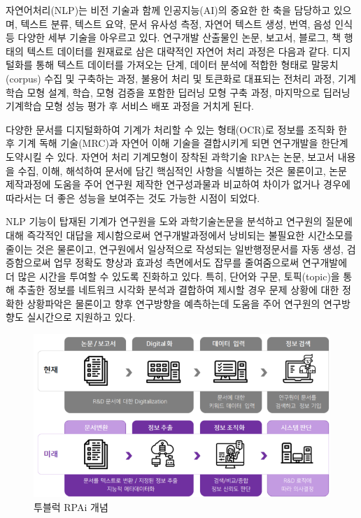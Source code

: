 \documentclass[smallextended]{svjour3}       %
\begin{document}
자연어처리(NLP)는 비전 기술과 함께 인공지능(AI)의 중요한 한 축을
담당하고 있으며, 텍스트 분류, 텍스트 요약, 문서 유사성 측정, 자연어
텍스트 생성, 번역, 음성 인식 등 다양한 세부 기술을 아우르고 있다.
연구개발 산출물인 논문, 보고서, 블로그, 책 행태의 텍스트 데이터를
원재료로 삼은 대략적인 자연어 처리 과정은 다음과 같다. 디지털화를 통해
텍스트 데이터를 가져오는 단계, 데이터 분석에 적합한 형태로
말뭉치(corpus) 수집 및 구축하는 과정, 불용어 처리 및 토큰화로 대표되는
전처리 과정, 기계학습 모형 설계, 학습, 모형 검증을 포함한 딥러닝 모형
구축 과정, 마지막으로 딥러닝 기계학습 모형 성능 평가 후 서비스 배포
과정을 거치게 된다.

다양한 문서를 디지털화하여 기계가 처리할 수 있는 형태(OCR)로 정보를
조직화 한 후 기계 독해 기술(MRC)과 자연어 이해 기술을 결합시키게 되면
연구개발을 한단계 도약시킬 수 있다. 자연어 처리 기계모형이 장착된
과학기술 RPA는 논문, 보고서 내용을 수집, 이해, 해석하여 문서에 담긴
핵심적인 사항을 식별하는 것은 물론이고, 논문 제작과정에 도움을 주어
연구원 제작한 연구성과물과 비교하여 차이가 없거나 경우에 따라서는 더
좋은 성능을 보여주는 것도 가능한 시점이 되었다.

NLP 기능이 탑재된 기계가 연구원을 도와 과학기술논문을 분석하고 연구원의
질문에 대해 즉각적인 대답을 제시함으로써 연구개발과정에서 낭비되는
불필요한 시간소모를 줄이는 것은 물론이고, 연구원에서 일상적으로 작성되는
일반행정문서를 자동 생성, 검증함으로써 업무 정확도 향상과 효과성
측면에서도 잡무를 줄여줌으로써 연구개발에 더 많은 시간을 투여할 수
있도록 진화하고 있다. 특히, 단어와 구문, 토픽(topic)을 통해 추출한
정보를 네트워크 시각화 분석과 결합하여 제시할 경우 문제 상황에 대한
정확한 상황파악은 물론이고 향후 연구방향을 예측하는데 도움을 주어
연구원의 연구방향도 실시간으로 지원하고 있다.

\begin{figure}

{\centering \includegraphics[width=1\linewidth]{fig/koita-two-block} 

}

\caption{투블럭 RPAi 개념}\label{fig:paradigm-tidyverse-twoblock}
\end{figure}




\end{document}
